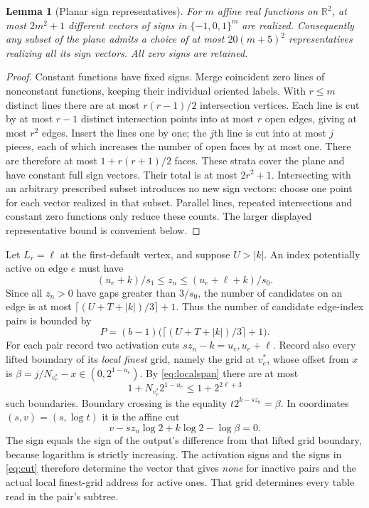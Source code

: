 \documentclass[11pt]{article}
\newtheorem{lemma}[theorem]{Lemma}
\theoremstyle{definition}
\theoremstyle{remark}
\newcommand{\R}{\mathbb R}
\begin{document}
\begin{lemma}[Planar sign representatives]\label{lem:arrangement}
For $m$ affine real functions on $\R^2$, at most $2m^2+1$ different vectors
of signs in $\{-1,0,1\}^m$ are realized. Consequently any subset of the plane
admits a choice of at most $20(m+5)^2$ representatives realizing all its sign
vectors. All zero signs are retained.
\end{lemma}
\begin{proof}
Constant functions have fixed signs. Merge coincident zero lines of nonconstant
functions, keeping their individual oriented labels. With $r\leq m$ distinct
lines there are at most $r(r-1)/2$ intersection vertices. Each line is cut by
at most $r-1$ distinct intersection points into at most $r$ open edges, giving
at most $r^2$ edges. Insert the lines one by one; the $j$th line is cut into
at most $j$ pieces, each of which increases the number of open faces by at
most one. There are therefore at most $1+r(r+1)/2$ faces. These strata cover
the plane and have constant full sign vectors. Their total is at most
$2r^2+1$. Intersecting with an arbitrary prescribed subset introduces no new
sign vectors: choose one point for each vector realized in that subset.
Parallel lines, repeated intersections and constant zero functions only reduce
these counts. The larger displayed representative bound is convenient below.
\end{proof}

Let $L_r=\ell$ at the first-default vertex, and suppose $U>|k|$.
An index potentially active on edge $e$ must have
\[
 (u_e+k)/s_1\leq z_n\leq(u_e+\ell+k)/s_0.
\]
Since all $z_n>0$ have gaps greater than $3/s_0$, the number of candidates on
an edge is at most $\lceil(U+T+|k|)/3\rceil+1$. Thus the number of candidate
edge-index pairs is bounded by
\begin{equation}\label{eq:P}
 P=(b-1)\bigl(\lceil(U+T+|k|)/3\rceil+1\bigr).
\end{equation}
For each pair record two activation cuts $sz_n-k=u_e,u_e+\ell$.
Record also every lifted boundary of its \emph{local finest} grid, namely the
grid at $v_e^*$, whose offset from $x$ is
$\beta=j/N_{v_e^*}-x\in(0,2^{1-u_e})$. By
\eqref{eq:localspan} there are at most
\[
 1+N_{v_e^*}2^{1-u_e}\leq1+2^{2\ell+3}
\]
such boundaries. Boundary crossing is the equality
$t2^{k-sz_n}=\beta$. In coordinates $(s,v)=(s,\log t)$ it is the affine cut
\begin{equation}\label{eq:cut}
 v-sz_n\log2+k\log2-\log\beta=0.
\end{equation}
The sign equals the sign of the output's difference from that lifted grid
boundary, because logarithm is strictly increasing. The activation signs
and the signs in \eqref{eq:cut} therefore determine the vector that gives
\emph{none} for inactive pairs and the actual local finest-grid address for
active ones. That grid determines every table read in the pair's subtree.
\end{document}

